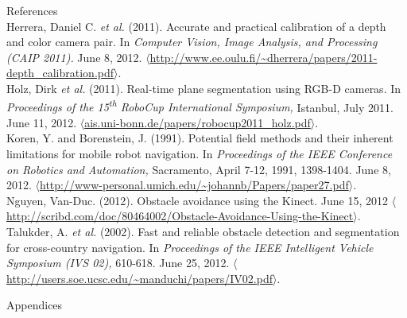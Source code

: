 \documentclass[12pt]{report}
\renewcommand{\Large}{\fontsize{18pt}{18pt}\selectfont}
\renewcommand{\large}{\fontsize{14pt}{14pt}\selectfont}
\begin{document}
\clearpage
{}
{}
{\large References} \\
\linebreak
{}
\label{bib:herrera}
Herrera, Daniel C. \textit{et al.} (2011). Accurate and practical calibration of a depth and color camera pair. In \textit{Computer Vision, Image Analysis, and Processing (CAIP 2011).} June 8, 2012. $\langle$\url{http://www.ee.oulu.fi/~dherrera/papers/2011-depth_calibration.pdf}$\rangle$.\\
\label{bib:holz}
Holz, Dirk \textit{et al.} (2011). Real-time plane segmentation using RGB-D cameras. In \textit{Proceedings of the 15\textsuperscript{th} RoboCup International Symposium,} Istanbul, July 2011. June 11, 2012. $\langle$\url{ais.uni-bonn.de/papers/robocup2011_holz.pdf}$\rangle$.\\
\label{bib:koren}
Koren, Y. and Borenstein, J. (1991). Potential field methods and their inherent limitations for mobile robot navigation. In \textit{Proceedings of the IEEE Conference on Robotics and Automation,} Sacramento, April 7-12, 1991, 1398-1404. June 8, 2012. $\langle$\url{http://www-personal.umich.edu/~johannb/Papers/paper27.pdf}$\rangle$.\\
\label{bib:nguyen}
Nguyen, Van-Duc. (2012). Obstacle avoidance using the Kinect. June 15, 2012 $\langle$\url{http://scribd.com/doc/80464002/Obstacle-Avoidance-Using-the-Kinect}$\rangle$.
\label{bib:talukder}
Talukder, A. \textit{et al.} (2002). Fast and reliable obstacle detection and segmentation for cross-country navigation. In \textit{Proceedings of the IEEE Intelligent Vehicle Symposium (IVS 02),} 610-618. June 25, 2012. $\langle$\url{http://users.soe.ucsc.edu/~manduchi/papers/IV02.pdf}$\rangle$.

\clearpage
{\Large Appendices} \\
\appendix
\end{document}

